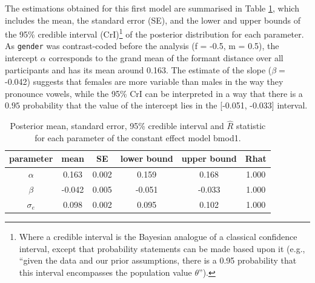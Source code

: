 \documentclass[a4paper,12pt,twoside,onecolumn,openright,final,oldfontcommands]{memoir}
\let\rmarkdownfootnote\footnote%
\def\footnote{\protect\rmarkdownfootnote}
\begin{document}
The estimations obtained for this first model are summarised in Table \ref{tab:sumbmod1}, which includes the mean, the standard error (SE), and the lower and upper bounds of the 95\% credible interval (CrI)\footnote{Where a credible interval is the Bayesian analogue of a classical confidence interval, except that probability statements can be made based upon it (e.g., \enquote{given the data and our prior assumptions, there is a 0.95 probability that this interval encompasses the population value \(\theta\)}).} of the posterior distribution for each parameter. As \texttt{gender} was contrast-coded before the analysis (f = -0.5, m = 0.5), the intercept \(\alpha\) corresponds to the grand mean of the formant distance over all participants and has its mean around 0.163. The estimate of the slope (\(\beta =\) -0.042) suggests that females are more variable than males in the way they pronounce vowels, while the 95\% CrI can be interpreted in a way that there is a \(0.95\) probability that the value of the intercept lies in the {[}-0.051, -0.033{]} interval.

\begin{table}[H]
\begin{center}
\begin{threeparttable}
\caption{\label{tab:sumbmod1}Posterior mean, standard error, 95\% credible interval and $\hat{R}$
    statistic for each parameter of the constant effect model bmod1.}
\small{
\begin{tabular}{cccccc}
\toprule
parameter & \multicolumn{1}{c}{mean} & \multicolumn{1}{c}{SE} & \multicolumn{1}{c}{lower bound} & \multicolumn{1}{c}{upper bound} & \multicolumn{1}{c}{Rhat}\\
\midrule
$\alpha$ & 0.163 & 0.002 & 0.159 & 0.168 & 1.000\\
$\beta$ & -0.042 & 0.005 & -0.051 & -0.033 & 1.000\\
$\sigma_{e}$ & 0.098 & 0.002 & 0.095 & 0.102 & 1.000\\
\bottomrule
\end{tabular}
}
\end{threeparttable}
\end{center}
\end{table}
\end{document}
